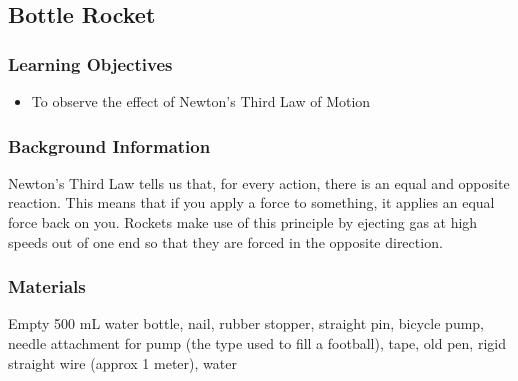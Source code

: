 %


\subsection{Bottle Rocket}

\subsubsection*{Learning Objectives}
\begin{itemize}
\item{To observe the effect of Newton's Third Law of Motion}
\end{itemize}

\subsubsection*{Background Information}
Newton's Third Law tells us that, for every action, there is an equal and opposite reaction.  This means that if you apply a force to something, it applies an equal force back on you.  Rockets make use of this principle by ejecting gas at high speeds out of one end so that they are forced in the opposite direction.

\subsubsection*{Materials}
Empty 500 mL water bottle, nail, rubber stopper, straight pin, bicycle pump, needle attachment for pump (the type used to fill a football), tape, old pen, rigid straight wire (approx 1 meter), water

